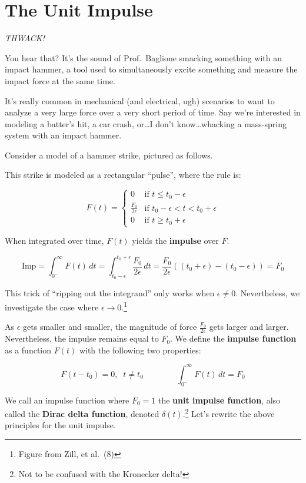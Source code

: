 \documentclass[
  letterpaper,
  DIV=11,
  numbers=noendperiod]{scrreprt}
\begin{document}
\hypertarget{the-unit-impulse}{%
\section{The Unit Impulse}\label{the-unit-impulse}}

\emph{THWACK!}

You hear that? It's the sound of Prof.~Baglione smacking something with
an impact hammer, a tool used to simultaneously excite something and
measure the impact force at the same time.

It's really common in mechanical (and electrical, ugh) scenarios to want
to analyze a very large force over a very short period of time. Say
we're interested in modeling a batter's hit, a car crash, or\ldots I
don't know\ldots whacking a mass-spring system with an impact hammer.

Consider a model of a hammer strike, pictured as follows.

This strike is modeled as a rectangular ``pulse'', where the rule is:

\[F(t) = \begin{cases}
    0 & \text{if } t \leq t_0 - \epsilon \\
    \frac{F_0}{2\epsilon} & \text{if } t_0 - \epsilon < t < t_0 + \epsilon \\
    0 & \text{if } t \ge t_0 + \epsilon
\end{cases}\]

When integrated over time, \(F(t)\) yields the \textbf{impulse} over
\(F\).

\[\text{Imp} = \int_{0^-}^{\infty} F(t) \, dt = \int_{t_0 - \epsilon}^{t_0 + \epsilon} \frac{F_0}{2\epsilon} \, dt = \frac{F_0}{2\epsilon} \left((t_0 + \epsilon)-(t_0 - \epsilon)\right) = F_0\]

This trick of ``ripping out the integrand'' only works when
\(\epsilon \neq 0\). Nevertheless, we investigate the case where
\(\epsilon \to 0\).\footnote{Figure from Zill, et al.~(8)}

As \(\epsilon\) gets smaller and smaller, the magnitude of force
\(\frac{F_0}{2\epsilon}\) gets larger and larger. Nevertheless, the
impulse remains equal to \(F_0\). We define the \textbf{impulse
function} as a function \(F(t)\) with the following two properties:

\[F(t-t_0)=0, \; \; t\neq t_0 \qquad \qquad \int_{0^-}^\infty F(t) \, dt = F_0\]

We call an impulse function where \(F_0 = 1\) the \textbf{unit impulse
function}, also called the \textbf{Dirac delta function}, denoted
\(\delta(t)\).\footnote{Not to be confused with the Kronecker delta!}
Let's rewrite the above principles for the unit impulse.
\end{document}
